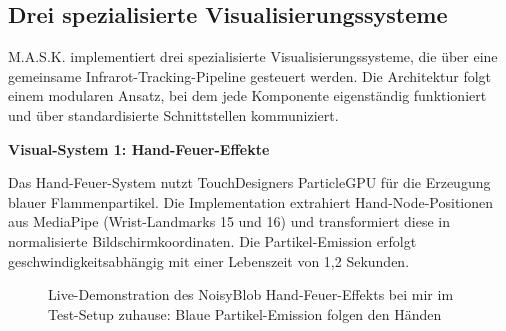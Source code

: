 \subsection{Drei spezialisierte Visualisierungssysteme}

M.A.S.K. implementiert drei spezialisierte Visualisierungssysteme, die über eine gemeinsame Infrarot-Tracking-Pipeline gesteuert werden. Die Architektur folgt einem modularen Ansatz, bei dem jede Komponente eigenständig funktioniert und über standardisierte Schnittstellen kommuniziert.

\textbf{Visual-System 1: Hand-Feuer-Effekte}

Das Hand-Feuer-System nutzt TouchDesigners ParticleGPU für die Erzeugung blauer Flammenpartikel. Die Implementation extrahiert Hand-Node-Positionen aus MediaPipe (Wrist-Landmarks 15 und 16) und transformiert diese in normalisierte Bildschirmkoordinaten. Die Partikel-Emission erfolgt geschwindigkeitsabhängig mit einer Lebenszeit von 1,2 Sekunden.

\begin{figure}[htbp]
    \centering
    \caption{Live-Demonstration des NoisyBlob Hand-Feuer-Effekts bei mir im Test-Setup zuhause: Blaue Partikel-Emission folgen den Händen}
    \label{fig:handfeuer_demonstration}
\end{figure}

